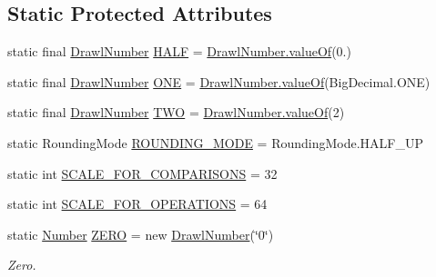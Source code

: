 \subsection*{Static Protected Attributes}
\begin{DoxyCompactItemize}
\item 
static final \hyperlink{classcom_1_1aarrelaakso_1_1drawl_1_1_drawl_number}{Drawl\+Number} \hyperlink{classcom_1_1aarrelaakso_1_1drawl_1_1_drawl_number_ae0980b8dd35b0bb52b87b37700d15322}{H\+A\+LF} = \hyperlink{classcom_1_1aarrelaakso_1_1drawl_1_1_drawl_number_a368da87af7b1b38bd5185715afadcad6}{Drawl\+Number.\+value\+Of}(0.)
\item 
static final \hyperlink{classcom_1_1aarrelaakso_1_1drawl_1_1_drawl_number}{Drawl\+Number} \hyperlink{classcom_1_1aarrelaakso_1_1drawl_1_1_drawl_number_a0cd06e1d6344869ed300bc99afcde20a}{O\+NE} = \hyperlink{classcom_1_1aarrelaakso_1_1drawl_1_1_drawl_number_a368da87af7b1b38bd5185715afadcad6}{Drawl\+Number.\+value\+Of}(Big\+Decimal.\+O\+NE)
\item 
static final \hyperlink{classcom_1_1aarrelaakso_1_1drawl_1_1_drawl_number}{Drawl\+Number} \hyperlink{classcom_1_1aarrelaakso_1_1drawl_1_1_drawl_number_a2bb7476cfb1cc76e2742cd00feb463c3}{T\+WO} = \hyperlink{classcom_1_1aarrelaakso_1_1drawl_1_1_drawl_number_a368da87af7b1b38bd5185715afadcad6}{Drawl\+Number.\+value\+Of}(2)
\item 
static Rounding\+Mode \hyperlink{classcom_1_1aarrelaakso_1_1drawl_1_1_drawl_number_ab4b44bb0675da90d8f435286911b711e}{R\+O\+U\+N\+D\+I\+N\+G\+\_\+\+M\+O\+DE} = Rounding\+Mode.\+H\+A\+L\+F\+\_\+\+UP
\item 
static int \hyperlink{classcom_1_1aarrelaakso_1_1drawl_1_1_drawl_number_ace1cb62d1ecce8212578d1a13cf5cbc4}{S\+C\+A\+L\+E\+\_\+\+F\+O\+R\+\_\+\+C\+O\+M\+P\+A\+R\+I\+S\+O\+NS} = 32
\item 
static int \hyperlink{classcom_1_1aarrelaakso_1_1drawl_1_1_drawl_number_ab9bb5bf4986830f56f01cb218ba637ce}{S\+C\+A\+L\+E\+\_\+\+F\+O\+R\+\_\+\+O\+P\+E\+R\+A\+T\+I\+O\+NS} = 64
\item 
static \hyperlink{interfacecom_1_1aarrelaakso_1_1drawl_1_1_number}{Number} \hyperlink{classcom_1_1aarrelaakso_1_1drawl_1_1_drawl_number_ae79e88954ed30a7f939cc62836fdc75c}{Z\+E\+RO} = new \hyperlink{classcom_1_1aarrelaakso_1_1drawl_1_1_drawl_number}{Drawl\+Number}(\char`\"{}0\char`\"{})
\begin{DoxyCompactList}\small\item\em Zero. \end{DoxyCompactList}\item 

\end{DoxyCompactItemize}
